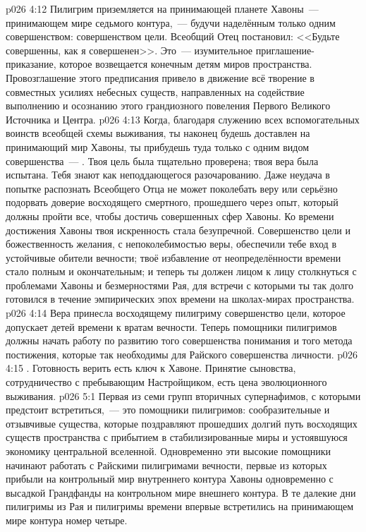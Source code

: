 \vs p026 4:12 Пилигрим приземляется на принимающей планете Хавоны~--- принимающем мире седьмого контура,~--- будучи наделённым только одним совершенством: совершенством цели. Всеобщий Отец постановил: <<Будьте совершенны, как я совершенен>>. Это~--- изумительное приглашение\hyp{}приказание, которое возвещается конечным детям миров пространства. Провозглашение этого предписания привело в движение всё творение в совместных усилиях небесных существ, направленных на содействие выполнению и осознанию этого грандиозного повеления Первого Великого Источника и Центра.
\vs p026 4:13 Когда, благодаря служению всех вспомогательных воинств всеобщей схемы выживания, ты наконец будешь доставлен на принимающий мир Хавоны, ты прибудешь туда только с одним видом совершенства~--- . Твоя цель была тщательно проверена; твоя вера была испытана. Тебя знают как неподдающегося разочарованию. Даже неудача в попытке распознать Всеобщего Отца не может поколебать веру или серьёзно подорвать доверие восходящего смертного, прошедшего через опыт, который должны пройти все, чтобы достичь совершенных сфер Хавоны. Ко времени достижения Хавоны твоя искренность стала безупречной. Совершенство цели и божественность желания, с непоколебимостью веры, обеспечили тебе вход в устойчивые обители вечности; твоё избавление от неопределённости времени стало полным и окончательным; и теперь ты должен лицом к лицу столкнуться с проблемами Хавоны и безмерностями Рая, для встречи с которыми ты так долго готовился в течение эмпирических эпох времени на школах\hyp{}мирах пространства.
\vs p026 4:14 Вера принесла восходящему пилигриму совершенство цели, которое допускает детей времени к вратам вечности. Теперь помощники пилигримов должны начать работу по развитию того совершенства понимания и того метода постижения, которые так необходимы для Райского совершенства личности.
\vs p026 4:15 . Готовность верить есть ключ к Хавоне. Принятие сыновства, сотрудничество с пребывающим Настройщиком, есть цена эволюционного выживания.
\vs p026 5:1 Первая из семи групп вторичных супернафимов, с которыми предстоит встретиться,~--- это помощники пилигримов: сообразительные и отзывчивые существа, которые поздравляют прошедших долгий путь восходящих существ пространства с прибытием в стабилизированные миры и устоявшуюся экономику центральной вселенной. Одновременно эти высокие помощники начинают работать с Райскими пилигримами вечности, первые из которых прибыли на контрольный мир внутреннего контура Хавоны одновременно с высадкой Грандфанды на контрольном мире внешнего контура. В те далекие дни пилигримы из Рая и пилигримы времени впервые встретились на принимающем мире контура номер четыре.
